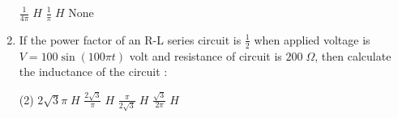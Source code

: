 \documentclass{article}
\begin{document}
\begin{enumerate}
\begin{tasks}
\task \( \displaystyle \frac{1}{4\pi} \;H \)
\task \( \displaystyle \frac{1}{\pi} \;H \)
\task None
\end{tasks}
\item If the power factor of an R-L series circuit is \( \frac{1}{2} \) when applied voltage is \( V = 100 \sin (100\pi t) \) volt and resistance of circuit is \( 200\;\Omega \), then calculate the inductance of the circuit :
\begin{tasks}(2)
\task \( \displaystyle 2\sqrt{3}\pi \;H \)
\task \( \displaystyle \frac{2\sqrt{3}}{\pi} \;H \)
\task \( \displaystyle \frac{\pi}{2\sqrt{3}} \;H \)
\task \( \displaystyle \frac{\sqrt{3}}{2\pi} \;H \)
\end{tasks}
\end{enumerate}
\end{document}
